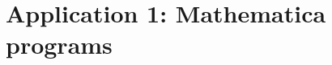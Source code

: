 \documentclass[12pt,letterpaper,oneside,reqno]{amsart}
\begin{document}
    
    



    \section*{Application 1: Mathematica programs}
    


%    
%
%
%    
\end{document}
